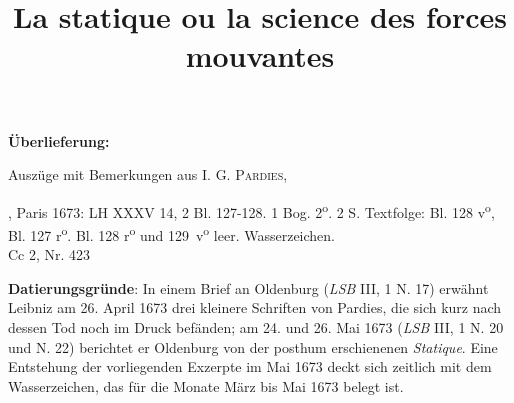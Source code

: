 \begin{ledgroupsized}[r]{120mm}
\footnotesize 
\pstart 
\noindent\textbf{\"{U}berlieferung:}
\pend
\end{ledgroupsized}
\begin{ledgroupsized}[r]{114mm}
\footnotesize 
\pstart \parindent -6mm
Auszüge mit Bemerkungen aus I. G. \textsc{Pardies},\cite{00296} \title{La statique ou la science des forces mouvantes}, Paris 1673: LH XXXV 14, 2 Bl. 127-128. 1 Bog. 2\textsuperscript{o}. 2 S. Textfolge: Bl. 128 v\textsuperscript{o}, Bl. 127 r\textsuperscript{o}. Bl. 128 r\textsuperscript{o} und 129~v\textsuperscript{o} leer. Wasserzeichen. \\Cc 2, Nr. 423 \pend
\end{ledgroupsized}
\vspace*{5mm}

\begin{ledgroup}
\footnotesize 
\pstart
\noindent\footnotesize{\textbf{Datierungsgr\"{u}nde}: In einem Brief an Oldenburg (\textit{LSB} III, 1 N. 17) erw\"{a}hnt Leibniz am 26. April 1673 drei kleinere Schriften von Pardies, die sich kurz nach dessen Tod noch im Druck bef\"{a}nden; am 24. und 26. Mai 1673 (\textit{LSB} III, 1 N. 20 und N. 22) berichtet er Oldenburg von der posthum erschienenen \textit{Statique}. Eine Entstehung der vorliegenden Exzerpte im Mai 1673 deckt sich zeitlich mit dem Wasserzeichen, das für die Monate März bis Mai 1673 belegt ist.}
\pend
\end{ledgroup}

